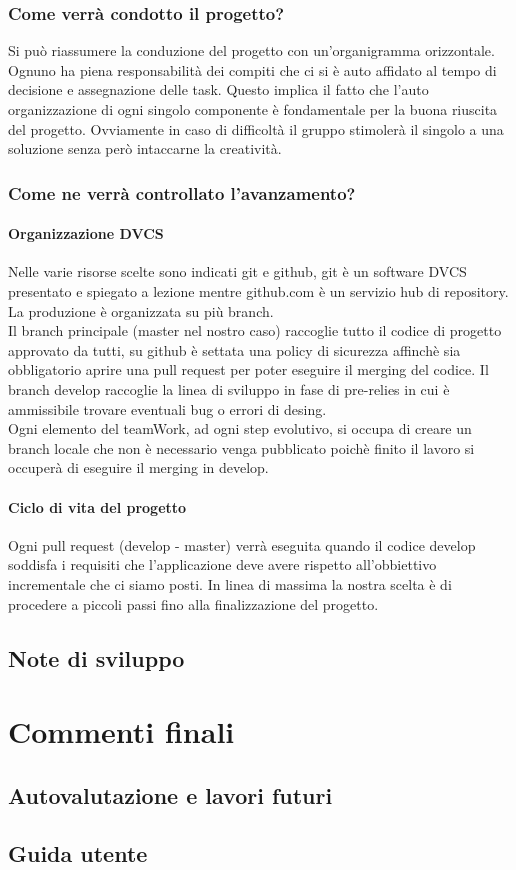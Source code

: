 \documentclass[a4paper,12pt]{report}
\begin{document}
\subsection{Come verrà condotto il progetto?}
Si può riassumere la conduzione del progetto con un'organigramma orizzontale.
Ognuno ha piena responsabilità dei compiti che ci si è auto affidato al tempo di decisione e assegnazione delle task.
Questo implica il fatto che l'auto organizzazione di ogni singolo componente è fondamentale per la buona riuscita del progetto.
Ovviamente in caso di difficoltà il gruppo stimolerà il singolo a una soluzione senza però intaccarne la creatività.
\subsection{Come ne verrà controllato l'avanzamento?}
\subsubsection{Organizzazione DVCS}
Nelle varie risorse scelte sono indicati git e github, git è un software DVCS presentato e spiegato a lezione mentre github.com è un servizio
hub di repository.
La produzione è organizzata su più branch.
\\Il branch principale (master nel nostro caso) raccoglie tutto il codice di progetto approvato da tutti, su github è settata una policy
di sicurezza affinchè sia obbligatorio aprire una pull request per poter eseguire il merging del codice.
Il branch develop raccoglie la linea di sviluppo in fase di pre-relies in cui è ammissibile trovare eventuali bug o errori di desing.
\\Ogni elemento del teamWork, ad ogni step evolutivo, si occupa di creare un branch locale che non è necessario venga pubblicato poichè finito
il lavoro si occuperà di eseguire il merging  in develop.
\subsubsection{Ciclo di vita del progetto}
Ogni pull request (develop - master) verrà eseguita quando il codice develop soddisfa i requisiti che l'applicazione deve avere rispetto
all'obbiettivo incrementale che ci siamo posti.
In linea di massima la nostra scelta è di procedere a piccoli passi fino alla finalizzazione del progetto.
\section{Note di sviluppo}
\chapter{Commenti finali}
\section{Autovalutazione e lavori futuri}

\appendix
\section{Guida utente}
\end{document}
